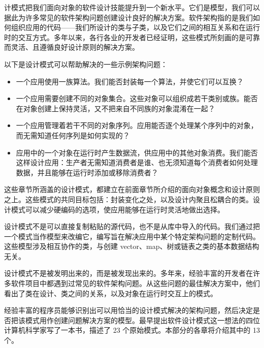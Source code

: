 计模式把我们面向对象的软件设计技能提升到一个新水平。它们是模型，我们可以据此为许多常见的软件架构问题创建设计良好的解决方案。软件架构指的是我们如何组织应用的代码——我们所设计的类与子类，以及它们之间的相互关系和在运行时的交互方式。多年以来，各行各业的开发者已经证明，这些模式所刻画的是可靠而灵活、且遵循良好设计原则的解决方案。

以下是设计模式可以帮助解决的一些示例架构问题：

\begin{itemize}
\item 一个应用使用一族算法。我们能否封装每一个算法，并使它们可以互换？
\item 一个应用需要创建不同的对象集合。这些对象可以组织成若干类别或族。能否在对象创建上保持灵活，又不把来自不同族的对象混淆在一起？
\item 一个应用管理着若干不同的对象序列。应用能否逐个处理某个序列中的对象，而无需知道任何序列是如何实现的？
\item 应用中的一个对象在运行时产生数据流，供应用中的其他对象消费。我们能否这样设计应用：生产者无需知道消费者是谁、也无须知道每个消费者如何处理数据，并且能够在运行时添加或移除消费者？
\end{itemize}

这些章节所涵盖的设计模式，都建立在前面章节所介绍的面向对象概念和设计原则之上。这些模式的共同目标包括：封装变化之处，以及设计内聚且松耦合的类。设计模式可以减少硬编码的选项，使应用能够在运行时灵活地做出选择。

设计模式不是可以直接复制粘贴的源代码，也不是从库中导入的代码。我们通过把一个模式当作模型来改编它，编写旨在解决应用中某个特定架构问题的定制代码。这些模型涉及相互协作的类，与创建 vector、map、树或链表之类的基本数据结构无关。

设计模式不是被发明出来的，而是被发现出来的。多年来，经验丰富的开发者在许多软件项目中都遇到过常见的软件架构问题。从这些问题的最佳解决方案中，他们看出了类在设计、类之间的关系，以及对象在运行时交互上的模式。

经验丰富的程序员能够识别出可以用恰当的设计模式解决的架构问题，然后决定是否把该模式用作创建问题解决方案的模型。最早提出软件设计模式这一想法的四位计算机科学家写了一本书，描述了 23 个原始模式。本部分的各章将介绍其中的 13 个。

